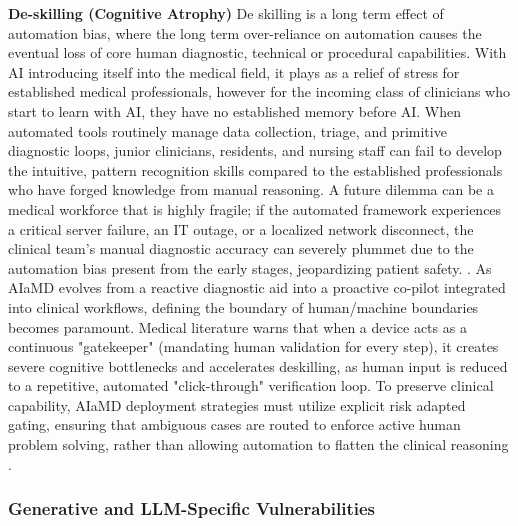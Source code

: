 \documentclass[11pt,a4paper]{article}
\begin{document}
\textbf{De-skilling (Cognitive Atrophy)}
De skilling is a long term effect of automation bias, where the long term over-reliance on automation causes the eventual loss of core human diagnostic, technical or procedural capabilities. With AI introducing itself into the medical field, it plays as a relief of stress for established medical professionals, however for the incoming class of clinicians who start to learn with AI, they have no established memory before AI. When automated tools routinely manage data collection, triage, and primitive diagnostic loops, junior clinicians, residents, and nursing staff can fail to develop the intuitive,  pattern recognition skills compared to the established professionals who have forged knowledge from manual reasoning. A future dilemma can be a medical workforce that is highly fragile; if the automated framework experiences a critical server failure, an IT outage, or a localized network disconnect, the clinical team's manual diagnostic accuracy can severely plummet due to the automation bias present from the early stages, jeopardizing patient safety. \cite{mhra2025} \cite{vanoyen2026} \cite{lyu2026} .
As AIaMD evolves from a reactive diagnostic aid into a proactive co-pilot integrated into clinical workflows, defining the boundary of human/machine boundaries becomes paramount. Medical literature warns that when a device acts as a continuous "gatekeeper" (mandating human validation for every step), it creates severe cognitive bottlenecks and accelerates deskilling, as human input is reduced to a repetitive, automated "click-through" verification loop. To preserve clinical capability, AIaMD deployment strategies must utilize explicit risk adapted gating, ensuring that ambiguous cases are routed to enforce active human problem solving, rather than allowing automation to flatten the clinical reasoning \cite{lyu2026} \cite{vanoyen2026} .



\subsubsection{Generative and LLM-Specific Vulnerabilities}
\label{sec:Generative and LLM-Specific Vulnerabilities}
\end{document}
